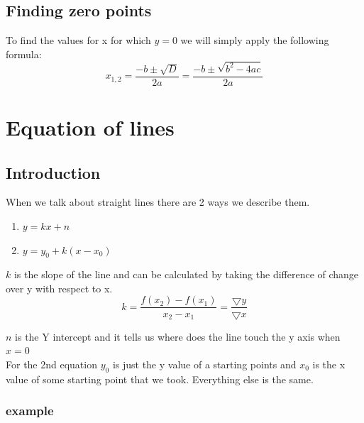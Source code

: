 \documentclass[a4paper, 15pt]{article}
\begin{document}
		\subsection{Finding zero points}
			\noindent To find the values for x for which $y = 0$ we will simply apply the following formula:
			\begin{equation*}
				x_{1,2} = \frac{-b \pm \sqrt{D}}{2a} = \frac{-b \pm \sqrt{b^2 - 4ac}}{2a} 
			\end{equation*}

	\section{Equation of lines}
		\subsection{Introduction}
			\noindent When we talk about straight lines there are 2 ways we describe them.
			\begin{enumerate}
				\item $y = kx + n$
				\item $y = y_0 + k(x - x_0)$
			\end{enumerate}

			\noindent $k$ is the slope of the line and can be calculated by taking the difference of change over y with respect to x.
			\begin{equation}
				k = \frac{f(x_2) - f(x_1)}{x_2 - x_1} = \frac{\bigtriangledown y}{\bigtriangledown x}
			\end{equation}

			\noindent $n$ is the Y intercept and it tells us where does the line touch the y axis when $x = 0$ \\
			\noindent For the 2nd equation $y_0$ is just the y value of a starting points and $x_0$ is the x value of some starting point that we took. Everything else is the same.
		
			\subsubsection{example}
				
				\begin{center}
				\end{center}
\end{document}
